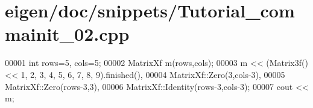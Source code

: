 \hypertarget{eigen_2doc_2snippets_2_tutorial__commainit__02_8cpp_source}{}\section{eigen/doc/snippets/\+Tutorial\+\_\+commainit\+\_\+02.cpp}
\label{eigen_2doc_2snippets_2_tutorial__commainit__02_8cpp_source}

\begin{DoxyCode}
00001 \textcolor{keywordtype}{int} rows=5, cols=5;
00002 MatrixXf m(rows,cols);
00003 m << (Matrix3f() << 1, 2, 3, 4, 5, 6, 7, 8, 9).finished(),
00004      MatrixXf::Zero(3,cols-3),
00005      MatrixXf::Zero(rows-3,3),
00006      MatrixXf::Identity(rows-3,cols-3);
00007 cout << m;
\end{DoxyCode}
